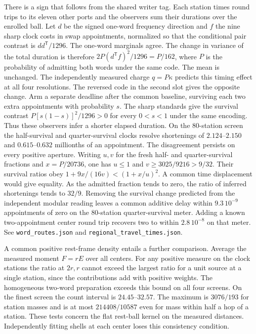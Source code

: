 \documentclass[11pt]{article}
\begin{document}
There is a sign that follows from the shared writer tag. Each station
times round trips to its eleven other ports and the observers sum their
durations over the enrolled ball. Let \(d\) be the signed one-word
frequency direction and \(f\) the nine sharp clock costs in swap
appointments, normalized so that the conditional pair contrast is
\(d d^{\mathsf T}/1296\). The one-word marginals agree. The change in
variance of the total duration is therefore
\(2P(d^{\mathsf T} f)^2/1296=P/162\), where \(P\) is the probability
of admitting both words under the same code. The mean is unchanged.
The independently measured charge \(q=P\kappa\) predicts this timing
effect at all four resolutions. The reversed code in the second slot
gives the opposite change. Arm a separate deadline after the common
baseline, surviving each two extra appointments with probability \(s\).
The sharp standards give the survival contrast
\(P[s(1-s)]^2/1296>0\) for every \(0<s<1\) under the same encoding.
Thus these observers infer a shorter elapsed duration. On the 80-station
screen the half-survival and quarter-survival clocks resolve shortenings
of \(2.124\)--\(2.150\) and \(0.615\)--\(0.632\) millionths of an
appointment. The disagreement persists on every positive aperture.
Writing \(u,v\) for the fresh half- and quarter-survival fractions and
\(x=P/20736\), one has \(u\le1\) and \(v\ge3025/9216>9/32\).
Their survival ratios obey
\(1+9x/(16v)<(1+x/u)^2\). A common time displacement would give
equality. As the admitted fraction tends to zero, the ratio of
inferred shortenings tends to \(32/9\). Removing the survival change
predicted from the independent modular reading leaves a common additive
delay within \(9.3\,10^{-9}\) appointments of zero on the 80-station
quarter-survival meter. Adding a known two-appointment center round
trip recovers two to within \(2.8\,10^{-8}\) on that meter.
See \texttt{word\_routes.json} and
\texttt{regional\_travel\_times.json}.

A common positive rest-frame density entails a further comparison.
Average the measured moment \(F=rE\) over all centers. For any positive
measure on the clock stations the ratio at \(2r,r\) cannot exceed the
largest ratio for a unit source at a single station, since the
contributions add with positive weights. The homogeneous two-word
preparation exceeds this bound on all four screens. On the finest
screen the count interval is \(24.45\)--\(32.57\). The maximum is
\(3076/193\) for station masses and is at most \(214408/10587\) even
for mass within half a hop of a station. These tests concern the flat
rest-ball kernel on the measured distances. Independently fitting
shells at each center loses this consistency condition.
\end{document}
